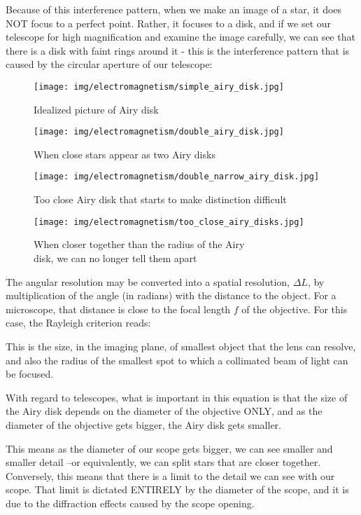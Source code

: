 	Because of this interference pattern, when we make an image of a star, it does NOT focus to a perfect point. Rather, it focuses to a disk, and if we set our telescope for high magnification and examine the image carefully, we can see that there is a disk with faint rings around it - this is the interference pattern that is caused by the circular aperture of our telescope:
	\begin{figure}[H]
		\centering
		\texttt{[image: img/electromagnetism/simple\_airy\_disk.jpg]}
		\caption[]{Idealized picture of Airy disk}
	\end{figure}
	\begin{figure}[H]
		\centering
		\texttt{[image: img/electromagnetism/double\_airy\_disk.jpg]}
		\caption[]{When close stars appear as two Airy disks}
	\end{figure}
	\begin{figure}[H]
		\centering
		\texttt{[image: img/electromagnetism/double\_narrow\_airy\_disk.jpg]}
		\caption[]{Too close Airy disk that starts to make distinction difficult}
	\end{figure}
	\begin{figure}[H]
		\centering
		\texttt{[image: img/electromagnetism/too\_close\_airy\_disks.jpg]}
		\caption[]{When closer together than the radius of the Airy\\ disk, we can no longer tell them apart}
	\end{figure}
	The angular resolution may be converted into a spatial resolution, $\Delta L$, by multiplication of the angle (in radians) with the distance to the object. For a microscope, that distance is close to the focal length $f$ of the objective. For this case, the Rayleigh criterion reads:
	
	This is the size, in the imaging plane, of smallest object that the lens can resolve, and also the radius of the smallest spot to which a collimated beam of light can be focused.
	
	With regard to telescopes, what is important in this equation is that the size of the Airy disk depends on the diameter of the objective ONLY, and as the diameter of the objective gets bigger, the Airy disk gets smaller.

	This means as the diameter of our scope gets bigger, we can see smaller and smaller detail --or equivalently, we can split stars that are closer together. Conversely, this means that there is a limit to the detail we can see with our scope. That limit is dictated ENTIRELY by the diameter of the scope, and it is due to the diffraction effects caused by the scope opening.

